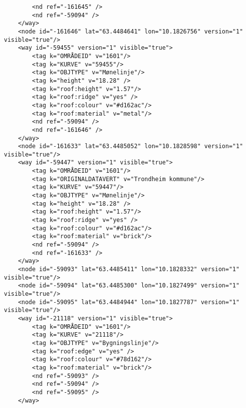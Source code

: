 \begin{lstlisting}
		<nd ref="-161645" />
		<nd ref="-59094" />
	</way>
	<node id="-161646" lat="63.4484641" lon="10.1826756" version="1" visible="true"/>
	<way id="-59455" version="1" visible="true">
		<tag k="OMRÅDEID" v="1601"/>
		<tag k="KURVE" v="59455"/>
		<tag k="OBJTYPE" v="Mønelinje"/>
		<tag k="height" v="18.28" />
		<tag k="roof:height" v="1.57"/>
		<tag k="roof:ridge" v="yes" />
		<tag k="roof:colour" v="#d162ac"/>
		<tag k="roof:material" v="metal"/>
		<nd ref="-59094" />
		<nd ref="-161646" />
	</way>
	<node id="-161633" lat="63.4485052" lon="10.1828598" version="1" visible="true"/>
	<way id="-59447" version="1" visible="true">
		<tag k="OMRÅDEID" v="1601"/>
		<tag k="ORIGINALDATAVERT" v="Trondheim kommune"/>
		<tag k="KURVE" v="59447"/>
		<tag k="OBJTYPE" v="Mønelinje"/>
		<tag k="height" v="18.28" />
		<tag k="roof:height" v="1.57"/>
		<tag k="roof:ridge" v="yes" />
		<tag k="roof:colour" v="#d162ac"/>
		<tag k="roof:material" v="brick"/>
		<nd ref="-59094" />
		<nd ref="-161633" />
	</way>
	<node id="-59093" lat="63.4485411" lon="10.1828332" version="1" visible="true"/>
	<node id="-59094" lat="63.4485300" lon="10.1827499" version="1" visible="true"/>
	<node id="-59095" lat="63.4484944" lon="10.1827787" version="1" visible="true"/>
	<way id="-21118" version="1" visible="true">
		<tag k="OMRÅDEID" v="1601"/>
		<tag k="KURVE" v="21118"/>
		<tag k="OBJTYPE" v="Bygningslinje"/>
		<tag k="roof:edge" v="yes" />
		<tag k="roof:colour" v="#78d162"/>
		<tag k="roof:material" v="brick"/>
		<nd ref="-59093" />
		<nd ref="-59094" />
		<nd ref="-59095" />
	</way> 
\end{lstlisting}

	